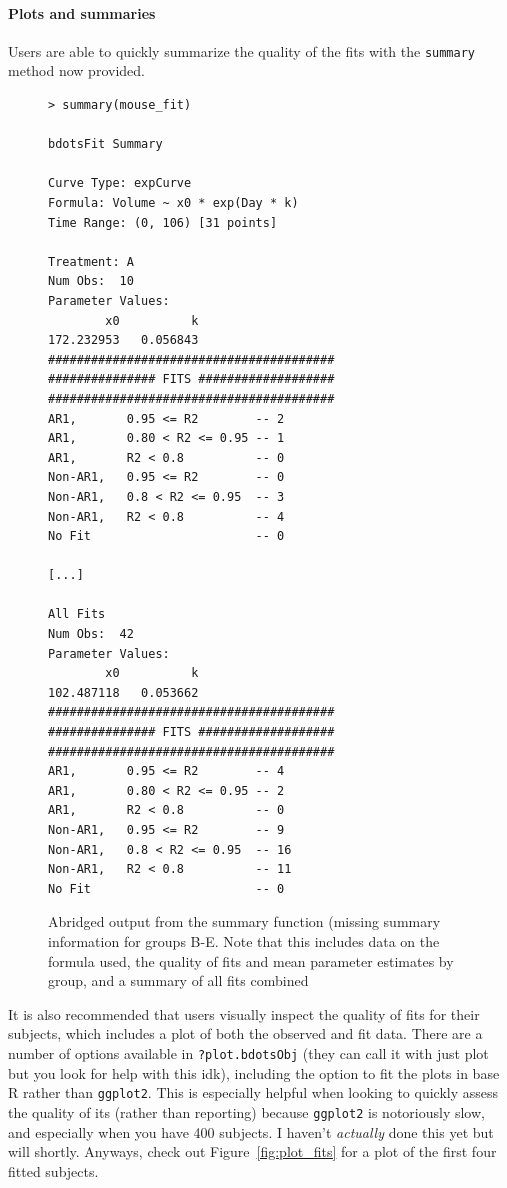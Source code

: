 \documentclass{article}
\newcommand{\xt}{\texttt}%
\begin{document}
\paragraph{Plots and summaries}

Users are able to quickly summarize the quality of the fits with the \xt{summary} method now provided. 

\begin{singlespace}
\begin{figure}[H]
\centering
\begin{BVerbatim}
> summary(mouse_fit)

bdotsFit Summary

Curve Type: expCurve 
Formula: Volume ~ x0 * exp(Day * k) 
Time Range: (0, 106) [31 points]

Treatment: A 
Num Obs:  10 
Parameter Values: 
        x0          k 
172.232953   0.056843 
########################################
############### FITS ###################
########################################
AR1,       0.95 <= R2        -- 2 
AR1,       0.80 < R2 <= 0.95 -- 1 
AR1,       R2 < 0.8          -- 0 
Non-AR1,   0.95 <= R2        -- 0 
Non-AR1,   0.8 < R2 <= 0.95  -- 3 
Non-AR1,   R2 < 0.8          -- 4 
No Fit                       -- 0 

[...]

All Fits 
Num Obs:  42 
Parameter Values: 
        x0          k 
102.487118   0.053662 
########################################
############### FITS ###################
########################################
AR1,       0.95 <= R2        -- 4 
AR1,       0.80 < R2 <= 0.95 -- 2 
AR1,       R2 < 0.8          -- 0 
Non-AR1,   0.95 <= R2        -- 9 
Non-AR1,   0.8 < R2 <= 0.95  -- 16 
Non-AR1,   R2 < 0.8          -- 11 
No Fit                       -- 0 
\end{BVerbatim}
\caption{Abridged output from the summary function (missing summary information for groups B-E. Note that this includes data on the formula used, the quality of fits and mean parameter estimates by group, and a summary of all fits combined}
\end{figure}
\end{singlespace}

It is also recommended that users visually inspect the quality of fits for their subjects, which includes a plot of both the observed and fit data. There are a number of options available in \xt{?plot.bdotsObj} (they can call it with just plot but you look for help with this idk), including the option to fit the plots in base R rather than \xt{ggplot2}. This is especially helpful when looking to quickly assess the quality of its (rather than reporting) because \xt{ggplot2} is notoriously slow, and especially when you have 400 subjects. I haven't \textit{actually} done this yet but will shortly. Anyways, check out Figure~\ref{fig:plot_fits} for a plot of the first four fitted subjects.
\end{document}
